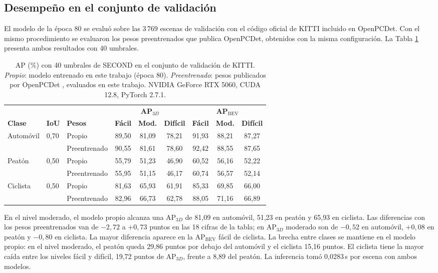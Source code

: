 \documentclass[11pt,letterpaper]{article}
\begin{document}
\subsection{Desempeño en el conjunto de validación}

El modelo de la época 80 se evaluó sobre las 3\,769 escenas de validación con el código oficial de KITTI incluido en OpenPCDet. Con el mismo procedimiento se evaluaron los pesos preentrenados que publica OpenPCDet, obtenidos con la misma configuración. La Tabla \ref{tab:propios} presenta ambos resultados con 40 umbrales.

\begin{table}[htbp]
\caption{AP (\%) con 40 umbrales de SECOND en el conjunto de validación de KITTI. \textit{Propio}: modelo entrenado en este trabajo (época 80). \textit{Preentrenado}: pesos publicados por OpenPCDet \cite{openpcdet}, evaluados en este trabajo. NVIDIA GeForce RTX 5060, CUDA 12.8, PyTorch 2.7.1.}
\label{tab:propios}
\centering
\small
\begin{tabular}{@{}lllcccccc@{}}
\toprule
 & & & \multicolumn{3}{c}{\textbf{AP$_{3D}$}} & \multicolumn{3}{c}{\textbf{AP$_{\text{BEV}}$}} \\
\cmidrule(lr){4-6} \cmidrule(l){7-9}
\textbf{Clase} & \textbf{IoU} & \textbf{Pesos} & \textbf{Fácil} & \textbf{Mod.} & \textbf{Difícil} & \textbf{Fácil} & \textbf{Mod.} & \textbf{Difícil} \\
\midrule
Automóvil & 0,70 & Propio       & 89,50 & 81,09 & 78,21 & 91,93 & 88,21 & 87,27 \\
          &      & Preentrenado & 90,55 & 81,61 & 78,60 & 92,42 & 88,55 & 87,65 \\
\addlinespace[2pt]
Peatón    & 0,50 & Propio       & 55,79 & 51,23 & 46,90 & 60,52 & 56,16 & 52,22 \\
          &      & Preentrenado & 55,95 & 51,15 & 46,17 & 60,74 & 56,57 & 52,14 \\
\addlinespace[2pt]
Ciclista  & 0,50 & Propio       & 81,63 & 65,93 & 61,91 & 85,33 & 69,85 & 66,00 \\
          &      & Preentrenado & 82,96 & 66,73 & 62,78 & 88,05 & 71,16 & 66,89 \\
\bottomrule
\end{tabular}
\end{table}

En el nivel moderado, el modelo propio alcanza una AP$_{3D}$ de 81,09 en automóvil, 51,23 en peatón y 65,93 en ciclista. Las diferencias con los pesos preentrenados van de $-2{,}72$ a $+0{,}73$ puntos en las 18 cifras de la tabla; en AP$_{3D}$ moderado son de $-0{,}52$ en automóvil, $+0{,}08$ en peatón y $-0{,}80$ en ciclista. La mayor diferencia aparece en la AP$_{\text{BEV}}$ fácil de ciclista. La brecha entre clases se mantiene en el modelo propio: en el nivel moderado, el peatón queda 29,86 puntos por debajo del automóvil y el ciclista 15,16 puntos. El ciclista tiene la mayor caída entre los niveles fácil y difícil, 19,72 puntos de AP$_{3D}$, frente a 8,89 del peatón. La inferencia tomó 0,0283\,s por escena con ambos modelos.
\end{document}
